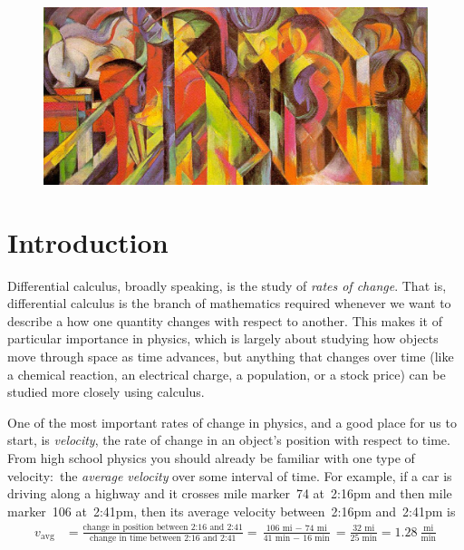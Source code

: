 




\noindent {}

\quad

\begin{figure}[h]
	\centering
	\includegraphics[height=0.4\textwidth]{figures/stables.jpg} %
\end{figure}

\section*{Introduction}

Differential calculus, broadly speaking, is the study of \textit{rates of change}. That is, differential calculus is the branch of mathematics required whenever we want to describe a how one quantity changes with respect to another. This makes it of particular importance in physics, which is largely about studying how objects move through space as time advances, but anything that changes over time (like a chemical reaction, an electrical charge, a population, or a stock price) can be studied more closely using calculus.

One of the most important rates of change in physics, and a good place for us to start, is \textit{velocity}, the rate of change in an object's position with respect to time. From high school physics you should already be familiar with one type of velocity:~the \textit{average velocity} over some interval of time. For example, if a car is driving along a highway and it crosses mile marker~74 at~2:16pm and then mile marker~106 at~2:41pm, then its average velocity between~2:16pm and~2:41pm is
\begin{align*}
	v_{\text{avg}} &= \frac{\text{change in position between 2:16 and 2:41}}{\text{change in time between 2:16 and 2:41}} = \frac{\text{106 mi $-$ 74 mi}}{\text{41 min $-$ 16 min}} = \frac{\text{32 mi}}{\text{25 min}} = 1.28~\frac{\text{mi}}{\text{min}}
\end{align*}

